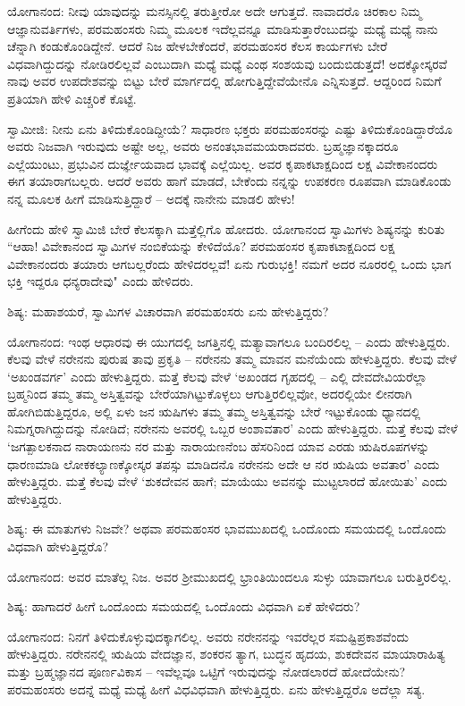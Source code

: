 ಯೋಗಾನಂದ: ನೀವು ಯಾವುದನ್ನು ಮನಸ್ಸಿನಲ್ಲಿ ತರುತ್ತೀರೋ ಅದೇ ಆಗುತ್ತದೆ. ನಾವಾದರೊ ಚಿರಕಾಲ ನಿಮ್ಮ ಆಜ್ಞಾನುವರ್ತಿಗಳು, ಪರಮಹಂಸರು ನಿಮ್ಮ ಮೂಲಕ ಇದೆಲ್ಲವನ್ನೂ ಮಾಡಿಸುತ್ತಾರೆಂಬುದನ್ನು ಮಧ್ಯೆ ಮಧ್ಯೆ ನಾನು ಚೆನ್ನಾಗಿ ಕಂಡುಕೊಂಡಿದ್ದೇನೆ. ಆದರೆ ನಿಜ ಹೇಳಬೇಕೆಂದರೆ, ಪರಮಹಂಸರ ಕೆಲಸ ಕಾರ್ಯಗಳು ಬೇರೆ ವಿಧವಾಗಿದ್ದುದನ್ನು ನೋಡಿರಲಿಲ್ಲವೆ ಎಂಬುದಾಗಿ ಮಧ್ಯೆ ಮಧ್ಯೆ ಎಂಥ ಸಂಶಯವು ಬಂದುಬಿಡುತ್ತದೆ! ಅದಕ್ಕೋಸ್ಕರವೆ ನಾವು ಅವರ ಉಪದೇಶವನ್ನು ಬಿಟ್ಟು ಬೇರೆ ಮಾರ್ಗದಲ್ಲಿ ಹೋಗುತ್ತಿದ್ದೇವೆಯೇನೊ ಎನ್ನಿಸುತ್ತದೆ. ಆದ್ದರಿಂದ ನಿಮಗೆ ಪ್ರತಿಯಾಗಿ ಹೇಳಿ ಎಚ್ಚರಿಕೆ ಕೊಟ್ಟೆ.

ಸ್ವಾಮೀಜಿ: ನೀನು ಏನು ತಿಳಿದುಕೊಂಡಿದ್ದೀಯೆ? ಸಾಧಾರಣ ಭಕ್ತರು ಪರಮಹಂಸರನ್ನು ಎಷ್ಟು ತಿಳಿದುಕೊಂಡಿದ್ದಾರೆಯೊ ಅವರು ನಿಜವಾಗಿ ಇರುವುದು ಅಷ್ಟೇ ಅಲ್ಲ, ಅವರು ಅನಂತಭಾವಮಯರಾದವರು. ಬ್ರಹ್ಮಜ್ಞಾನಕ್ಕಾದರೂ ಎಲ್ಲೆಯುಂಟು, ಪ್ರಭುವಿನ ದುರ್ಜ್ಞೇಯವಾದ ಭಾವಕ್ಕೆ ಎಲ್ಲೆಯಿಲ್ಲ. ಅವರ ಕೃಪಾಕಟಾಕ್ಷದಿಂದ ಲಕ್ಷ ವಿವೇಕಾನಂದರು ಈಗ ತಯಾರಾಗಬಲ್ಲರು. ಆದರೆ ಅವರು ಹಾಗೆ ಮಾಡದೆ, ಬೇಕೆಂದು ನನ್ನನ್ನು ಉಪಕರಣ ರೂಪವಾಗಿ ಮಾಡಿಕೊಂಡು ನನ್ನ ಮೂಲಕ ಹೀಗೆ ಮಾಡಿಸುತ್ತಿದ್ದಾರೆ – ಅದಕ್ಕೆ ನಾನೇನು ಮಾಡಲಿ ಹೇಳು!

ಹೀಗೆಂದು ಹೇಳಿ ಸ್ವಾಮಿಜಿ ಬೇರೆ ಕೆಲಸಕ್ಕಾಗಿ ಮತ್ತೆಲ್ಲಿಗೊ ಹೋದರು. ಯೋಗಾನಂದ ಸ್ವಾಮಿಗಳು ಶಿಷ್ಯನನ್ನು ಕುರಿತು “ಆಹಾ! ವಿವೇಕಾನಂದ ಸ್ವಾಮಿಗಳ ನಂಬಿಕೆಯನ್ನು ಕೇಳಿದೆಯೊ? ಪರಮಹಂಸರ ಕೃಪಾಕಟಾಕ್ಷದಿಂದ ಲಕ್ಷ ವಿವೇಕಾನಂದರು ತಯಾರು ಆಗಬಲ್ಲರೆಂದು ಹೇಳಿದರಲ್ಲವೆ! ಏನು ಗುರುಭಕ್ತಿ! ನಮಗೆ ಅದರ ನೂರರಲ್ಲಿ ಒಂದು ಭಾಗ ಭಕ್ತಿ ಇದ್ದರೂ ಧನ್ಯರಾದೇವು" ಎಂದು ಹೇಳಿದರು.

ಶಿಷ್ಯ: ಮಹಾಶಯರೆ, ಸ್ವಾಮಿಗಳ ವಿಚಾರವಾಗಿ ಪರಮಹಂಸರು ಏನು ಹೇಳುತ್ತಿದ್ದರು?

ಯೋಗಾನಂದ: ಇಂಥ ಆಧಾರವು ಈ ಯುಗದಲ್ಲಿ ಜಗತ್ತಿನಲ್ಲಿ ಮತ್ಯಾವಾಗಲೂ ಬಂದಿರಲಿಲ್ಲ – ಎಂದು ಹೇಳುತ್ತಿದ್ದರು. ಕೆಲವು ವೇಳೆ ನರೇನನು ಪುರುಷ ತಾವು ಪ್ರಕೃತಿ – ನರೇನನು ತಮ್ಮ ಮಾವನ ಮನೆಯೆಂದು ಹೇಳುತ್ತಿದ್ದರು. ಕೆಲವು ವೇಳೆ ‘ಅಖಂಡವರ್ಗ’ ಎಂದು ಹೇಳುತ್ತಿದ್ದರು. ಮತ್ತೆ ಕೆಲವು ವೇಳೆ ‘ಅಖಂಡದ ಗೃಹದಲ್ಲಿ – ಎಲ್ಲಿ ದೇವದೇವಿಯರೆಲ್ಲಾ ಬ್ರಹ್ಮನಿಂದ ತಮ್ಮ ತಮ್ಮ ಅಸ್ತಿತ್ವವನ್ನು ಬೇರೆಯಾಗಿಟ್ಟುಕೊಳ್ಳಲು ಆಗುತ್ತಿರಲಿಲ್ಲವೋ, ಅದರಲ್ಲಿಯೇ ಲೀನರಾಗಿ ಹೋಗಿಬಿಡುತ್ತಿದ್ದರೂ, ಅಲ್ಲಿ ಏಳು ಜನ ಋಷಿಗಳು ತಮ್ಮ ತಮ್ಮ ಅಸ್ತಿತ್ವವನ್ನು ಬೇರೆ ಇಟ್ಟುಕೊಂಡು ಧ್ಯಾನದಲ್ಲಿ ನಿಮಗ್ನರಾಗಿದ್ದುದನ್ನು ನೋಡಿದೆ; ನರೇನನು ಅವರಲ್ಲಿ ಒಬ್ಬರ ಅಂಶಾವತಾರ’ ಎಂದು ಹೇಳುತ್ತಿದ್ದರು. ಮತ್ತೆ ಕೆಲವು ವೇಳೆ ‘ಜಗತ್ಪಾಲಕನಾದ ನಾರಾಯಣನು ನರ ಮತ್ತು ನಾರಾಯಣನೆಂಬ ಹೆಸರಿನಿಂದ ಯಾವ ಎರಡು ಋಷಿರೂಪಗಳನ್ನು ಧಾರಣಮಾಡಿ ಲೋಕಕಲ್ಯಾಣಕ್ಕೋಸ್ಕರ ತಪಸ್ಸು ಮಾಡಿದನೊ ನರೇನನು ಅದೇ ಆ ನರ ಋಷಿಯ ಅವತಾರ’ ಎಂದು ಹೇಳುತ್ತಿದ್ದರು. ಮತ್ತೆ ಕೆಲವು ವೇಳೆ ‘ಶುಕದೇವನ ಹಾಗೆ; ಮಾಯೆಯು ಅವನನ್ನು ಮುಟ್ಟಲಾರದೆ ಹೋಯಿತು’ ಎಂದು ಹೇಳುತ್ತಿದ್ದರು.

ಶಿಷ್ಯ: ಈ ಮಾತುಗಳು ನಿಜವೇ? ಅಥವಾ ಪರಮಹಂಸರ ಭಾವಮುಖದಲ್ಲಿ ಒಂದೊಂದು ಸಮಯದಲ್ಲಿ ಒಂದೊಂದು ವಿಧವಾಗಿ ಹೇಳುತ್ತಿದ್ದರೊ?

ಯೋಗಾನಂದ: ಅವರ ಮಾತೆಲ್ಲ ನಿಜ. ಅವರ ಶ‍್ರೀಮುಖದಲ್ಲಿ ಭ್ರಾಂತಿಯಿಂದಲೂ ಸುಳ್ಳು ಯಾವಾಗಲೂ ಬರುತ್ತಿರಲಿಲ್ಲ.

ಶಿಷ್ಯ: ಹಾಗಾದರೆ ಹೀಗೆ ಒಂದೊಂದು ಸಮಯದಲ್ಲಿ ಒಂದೊಂದು ವಿಧವಾಗಿ ಏಕೆ ಹೇಳಿದರು?

ಯೋಗಾನಂದ: ನಿನಗೆ ತಿಳಿದುಕೊಳ್ಳುವುದಕ್ಕಾಗಲಿಲ್ಲ. ಅವರು ನರೇನನನ್ನು ಇವರೆಲ್ಲರ ಸಮಷ್ಟಿಪ್ರಕಾಶವೆಂದು ಹೇಳುತ್ತಿದ್ದರು. ನರೇನನಲ್ಲಿ ಋಷಿಯ ವೇದಜ್ಞಾನ, ಶಂಕರನ ತ್ಯಾಗ, ಬುದ್ಧನ ಹೃದಯ, ಶುಕದೇವನ ಮಾಯಾರಾಹಿತ್ಯ ಮತ್ತು ಬ್ರಹ್ಮಜ್ಞಾನದ ಪೂರ್ಣವಿಕಾಸ – ಇವೆಲ್ಲವೂ ಒಟ್ಟಿಗೆ ಇರುವುದನ್ನು ನೋಡಲಾರದೆ ಹೋದೆಯೇನು? ಪರಮಹಂಸರು ಅದನ್ನೆ ಮಧ್ಯೆ ಮಧ್ಯೆ ಹೀಗೆ ವಿಧವಿಧವಾಗಿ ಹೇಳುತ್ತಿದ್ದರು. ಏನು ಹೇಳುತ್ತಿದ್ದರೊ ಅದೆಲ್ಲಾ ಸತ್ಯ.

